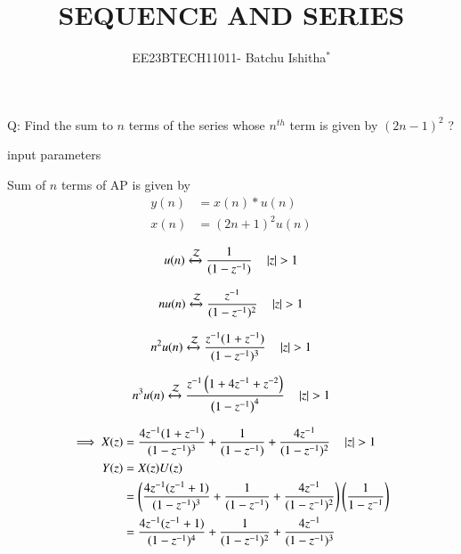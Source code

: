 \documentclass[journal,12pt,onecolumn]{IEEEtran}
\theoremstyle{remark}
\begin{document}
\let\vec\mathbf



\title{SEQUENCE AND SERIES}
\author{EE23BTECH11011- Batchu Ishitha$^{*}$%
}
\maketitle




\bigskip

\renewcommand{\thefigure}{\theenumi}
\renewcommand{\thetable}{\theenumi}

Q: Find the sum to $n$ terms of the series whose $n^{th}$ term is given by $(2n-1)^2$ ?

\solution

\begin{table}[!ht]
    \centering
        
    \caption{input parameters}
    \label{}
\end{table}
Sum of $n$ terms of AP is given by
\begin{align}
 y(n)&=x(n)*u(n) \\
x(n)&= (2n+1)^2 u(n) 
\end{align}

\begin{equation}
   u(n) \xleftrightarrow{\mathcal{Z}} \frac{1}{(1-z^{-1})}  \quad \left\vert z\right\vert>1\\ \label{eq:11.9.4.10.1.eq}
\end{equation}

\begin{equation}   
   nu(n) \xleftrightarrow{\mathcal{Z}} \frac{z^{-1}}{(1-z^{-1})^2} \quad \left\vert z\right\vert>1\\ \label{eq:11.9.4.10.2.eq}
\end{equation}

\begin{equation}   
   n^2u(n) \xleftrightarrow{\mathcal{Z}} \frac{z^{-1}(1+z^{-1})}{(1-z^{-1})^3} \quad \left\vert z\right\vert>1 \\ \label{eq:11.9.4.10.3.eq}
\end{equation}  

\begin{equation}
n^3u(n) \xleftrightarrow{\mathcal{Z}} \frac{z^{-1}\left(1+4z^{-1}+z^{-2}\right)}{\left(1-z^{-1}\right)^4} \quad \left\vert z\right\vert>1 \\ \label{eq:11.9.4.10.4.eq}
\end{equation} 
 
\begin{align}
\implies  X(z)&=\frac{4z^{-1}(1+z^{-1})}{(1-z^{-1})^3} + \frac{1}{(1-z^{-1})} + \frac{4z^{-1}}{(1-z^{-1})^2} \quad \left\vert z\right\vert>1 \\
 Y(z) &= X(z)U(z) \\
 &= \left(\frac{4z^{-1}(z^{-1}+1)}{(1-z^{-1})^3} + \frac{1}{(1-z^{-1})} + \frac{4z^{-1}}{(1-z^{-1})^2}\right)\left(\frac{1}{1-z^{-1}}\right)\\
 &= \frac{4z^{-1}(z^{-1}+1)}{(1-z^{-1})^4} + \frac{1}{(1-z^{-1})^2} + \frac{4z^{-1}}{(1-z^{-1})^3}
 \end{align}
 
\end{document}
